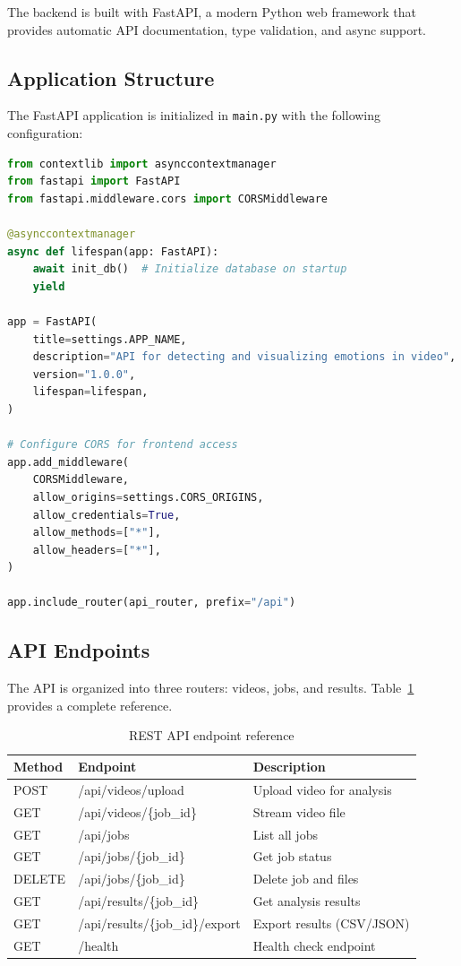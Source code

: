 The backend is built with FastAPI, a modern Python web framework that provides automatic API documentation, type validation, and async support.

\subsection{Application Structure}

The FastAPI application is initialized in \texttt{main.py} with the following configuration:

\begin{lstlisting}[language=Python, caption={FastAPI application setup (main.py)}]
from contextlib import asynccontextmanager
from fastapi import FastAPI
from fastapi.middleware.cors import CORSMiddleware

@asynccontextmanager
async def lifespan(app: FastAPI):
    await init_db()  # Initialize database on startup
    yield

app = FastAPI(
    title=settings.APP_NAME,
    description="API for detecting and visualizing emotions in video",
    version="1.0.0",
    lifespan=lifespan,
)

# Configure CORS for frontend access
app.add_middleware(
    CORSMiddleware,
    allow_origins=settings.CORS_ORIGINS,
    allow_credentials=True,
    allow_methods=["*"],
    allow_headers=["*"],
)

app.include_router(api_router, prefix="/api")
\end{lstlisting}

\subsection{API Endpoints}

The API is organized into three routers: videos, jobs, and results. Table~\ref{tab:api-endpoints} provides a complete reference.

\begin{table}[H]
\centering
\small
\begin{tabular}{|l|l|p{6cm}|}
\hline
\textbf{Method} & \textbf{Endpoint} & \textbf{Description} \\
\hline
POST & /api/videos/upload & Upload video for analysis \\
GET & /api/videos/\{job\_id\} & Stream video file \\
\hline
GET & /api/jobs & List all jobs \\
GET & /api/jobs/\{job\_id\} & Get job status \\
DELETE & /api/jobs/\{job\_id\} & Delete job and files \\
\hline
GET & /api/results/\{job\_id\} & Get analysis results \\
GET & /api/results/\{job\_id\}/export & Export results (CSV/JSON) \\
\hline
GET & /health & Health check endpoint \\
\hline
\end{tabular}
\caption{REST API endpoint reference}
\label{tab:api-endpoints}
\end{table}


